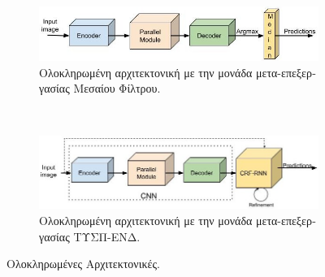 \begin{figure}[h]
\centering

\begin{subfigure}[b]{1\linewidth}
\includegraphics[scale=0.6]{Images/whole_arch_1}
 \caption{\textgreek{Ολοκληρωμένη αρχιτεκτονική με την μονάδα μετα-επεξεργασίας Μεσαίου Φίλτρου.}}
 \end{subfigure}
 \\[1cm]
 \begin{subfigure}[b]{1\linewidth}
\includegraphics[scale=0.6]{Images/whole_arch_2}
\caption{\textgreek{Ολοκληρωμένη αρχιτεκτονική με την μονάδα μετα-επεξεργασίας ΤΥΣΠ-ΕΝΔ.}}
\end{subfigure}

\caption[\textgreek{Αρχιτεκτονικές ΣΝΔ}]{\textgreek{Ολοκληρωμένες Αρχιτεκτονικές.}}
\label{fig:systems}
\end{figure}



